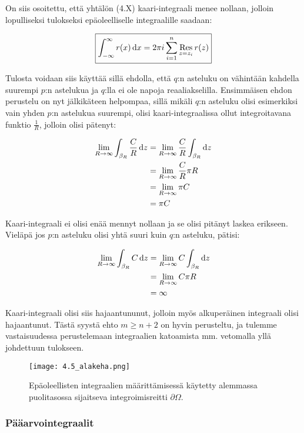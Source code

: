 \documentclass[../integrointiopas.tex]{subfiles}
\begin{document}
	On siis osoitettu, että yhtälön (4.X) kaari-integraali menee nollaan, jolloin lopulliseksi tulokseksi epäoleelliselle integraalille saadaan:
	
	\begin{equation}
		\boxed{\int_{-\infty}^{\infty}r(x)\odif{x} = 2\pi i\sum_{i = 1}^{n}\res{z = z_i}r(z)}
	\end{equation}

	Tulosta voidaan siis käyttää sillä ehdolla, että $q$:n asteluku on vähintään kahdella suurempi $p$:n astelukua ja $q$:lla ei ole napoja reaaliakselilla. Ensimmäisen ehdon perustelu on nyt jälkikäteen helpompaa, sillä mikäli $q$:n asteluku olisi esimerkiksi vain yhden $p$:n astelukua suurempi, olisi kaari-integraalissa ollut integroitavana funktio $\frac{1}{R}$, jolloin olisi pätenyt:
	
	\begin{align}
		\lim_{R\to\infty}\int_{\beta_R}\frac{C}{R}\odif{z} &= \lim_{R\to\infty}\frac{C}{R}\int_{\beta_R}\odif{z} \\
		&= \lim_{R\to\infty}\frac{C}{R}\pi R \\
		&= \lim_{R\to\infty}\pi C \\
		&= \pi C
	\end{align}

	Kaari-integraali ei olisi enää mennyt nollaan ja se olisi pitänyt laskea erikseen. Vieläpä jos $p$:n asteluku olisi yhtä suuri kuin $q$:n asteluku, pätisi:
	
	\begin{align}
		\lim_{R\to\infty}\int_{\beta_R}C\odif{z} &= \lim_{R\to\infty}C\int_{\beta_R}\odif{z} \\
		&= \lim_{R\to\infty}C\pi R \\
		&= \infty
	\end{align}

	Kaari-integraali olisi siis hajaantununut, jolloin myös alkuperäinen integraali olisi hajaantunut. Tästä syystä ehto $m \geq n + 2$ on hyvin perusteltu, ja tulemme vastaisuudessa perustelemaan integraalien katoamista mm. vetomalla yllä johdettuun tulokseen.


	\begin{figure}[h!]
		\centering
		\texttt{[image: 4.5\_alakeha.png]}
		\caption{Epäoleellisten integraalien määrittämisessä käytetty alemmassa puolitasossa sijaitseva integroimisreitti $\partial\Omega$.}
	\end{figure}

	\subsubsection{Pääarvointegraalit}
	
\end{document}

